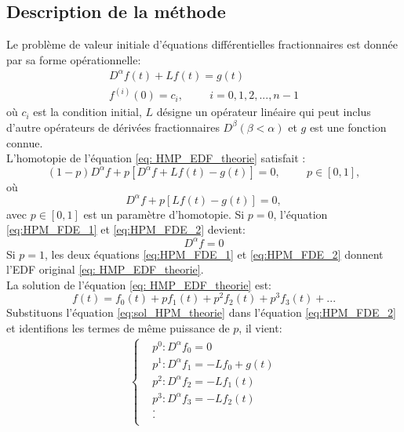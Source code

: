 \subsection{Description de la méthode}
 Le problème de valeur initiale d'équations différentielles fractionnaires est donnée par sa forme opérationnelle:
 \begin{align}\label{eq: HMP_EDF_theorie}
     D^{\alpha} f(t) + Lf(t) = g(t)\\
     f^{(i)} (0) = c_i, \hspace{1cm} i=0,1,2, ..., n-1
 \end{align}
 où $c_i$ est la condition initial, $L$ désigne un opérateur linéaire qui peut inclus d'autre opérateurs de dérivées fractionnaires $D^{\beta}(\beta < \alpha)$ et $g$ est une fonction connue.
\\
L'homotopie de l'équation \ref{eq: HMP_EDF_theorie} satisfait :
  \begin{equation}\label{eq:HPM_FDE_1}
      (1-p)D^{\alpha} f +p\left[ D^{\alpha}f + Lf(t) -g(t)\right]=0, \hspace{1cm} p\in [0,1],
  \end{equation}
  où
  \begin{equation}\label{eq:HPM_FDE_2}
      D^{\alpha}f+p\left[Lf(t)-g(t)\right]=0,
  \end{equation}
  avec $p\in[0,1]$ est un paramètre d'homotopie. Si $p=0$, l'équation \ref{eq:HPM_FDE_1} et \ref{eq:HPM_FDE_2} devient:
  \begin{equation}
      D^{\alpha} f=0
  \end{equation}
  Si $p=1$, les deux équations \ref{eq:HPM_FDE_1} et \ref{eq:HPM_FDE_2} donnent l'EDF original \ref{eq: HMP_EDF_theorie}.\\
  La solution de l'équation \ref{eq: HMP_EDF_theorie} est:
  \begin{equation} \label{eq:sol_HPM_theorie}
      f(t)=f_0(t)+pf_1(t)+p^2f_2(t)+p^3f_3(t) + ...
  \end{equation}
  Substituons l'équation \ref{eq:sol_HPM_theorie} dans l'équation \ref{eq:HPM_FDE_2} et identifions les termes de même puissance de $p$, il vient:
  \begin{align*}
  \begin{cases}
            & p^0 : D^{\alpha} f_0 = 0\\
      & p^1 : D^{\alpha} f_1 = -Lf_0 + g(t)\\
      & p^2 : D^{\alpha} f_2 = -Lf_1(t)\\
      & p^3 : D^{\alpha} f_3 = -Lf_2(t)\\
      & .\\
      & .\\
  \end{cases}
  \end{align*}

